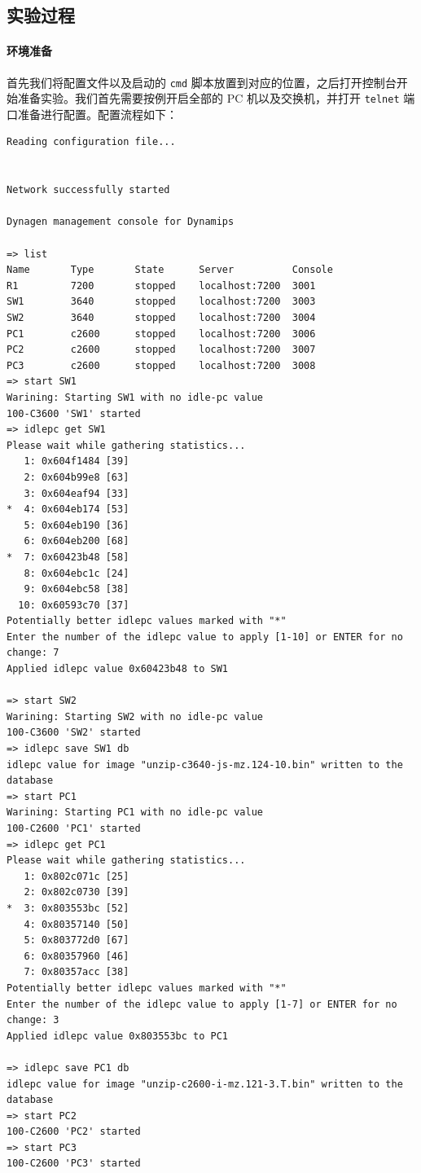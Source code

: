 \documentclass[black,normal,cn]{elegantnote}
\begin{document}
\subsection{实验过程}

\paragraph{环境准备}
首先我们将配置文件以及启动的 \texttt{cmd} 脚本放置到对应的位置，之后打开控制台开始准备实验。我们首先需要按例开启全部的 PC 机以及交换机，并打开 \texttt{telnet} 端口准备进行配置。配置流程如下：
\begin{lstlisting}
Reading configuration file...


Network successfully started

Dynagen management console for Dynamips

=> list
Name       Type       State      Server          Console
R1         7200       stopped    localhost:7200  3001
SW1        3640       stopped    localhost:7200  3003
SW2        3640       stopped    localhost:7200  3004
PC1        c2600      stopped    localhost:7200  3006
PC2        c2600      stopped    localhost:7200  3007
PC3        c2600      stopped    localhost:7200  3008
=> start SW1
Warining: Starting SW1 with no idle-pc value
100-C3600 'SW1' started
=> idlepc get SW1
Please wait while gathering statistics...
   1: 0x604f1484 [39]
   2: 0x604b99e8 [63]
   3: 0x604eaf94 [33]
*  4: 0x604eb174 [53]
   5: 0x604eb190 [36]
   6: 0x604eb200 [68]
*  7: 0x60423b48 [58]
   8: 0x604ebc1c [24]
   9: 0x604ebc58 [38]
  10: 0x60593c70 [37]
Potentially better idlepc values marked with "*"
Enter the number of the idlepc value to apply [1-10] or ENTER for no change: 7
Applied idlepc value 0x60423b48 to SW1

=> start SW2
Warining: Starting SW2 with no idle-pc value
100-C3600 'SW2' started
=> idlepc save SW1 db
idlepc value for image "unzip-c3640-js-mz.124-10.bin" written to the database
=> start PC1
Warining: Starting PC1 with no idle-pc value
100-C2600 'PC1' started
=> idlepc get PC1
Please wait while gathering statistics...
   1: 0x802c071c [25]
   2: 0x802c0730 [39]
*  3: 0x803553bc [52]
   4: 0x80357140 [50]
   5: 0x803772d0 [67]
   6: 0x80357960 [46]
   7: 0x80357acc [38]
Potentially better idlepc values marked with "*"
Enter the number of the idlepc value to apply [1-7] or ENTER for no change: 3
Applied idlepc value 0x803553bc to PC1

=> idlepc save PC1 db
idlepc value for image "unzip-c2600-i-mz.121-3.T.bin" written to the database
=> start PC2
100-C2600 'PC2' started
=> start PC3
100-C2600 'PC3' started
\end{lstlisting}
\end{document}
